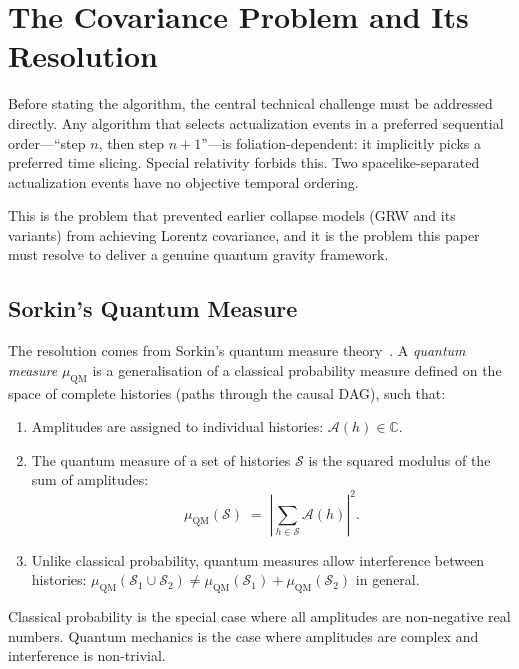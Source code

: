 \documentclass[11pt,a4paper]{article}
\theoremstyle{plain}
\theoremstyle{definition}
\theoremstyle{remark}
\newcommand{\muC}{\mu_{\mathrm{QM}}}   %
\begin{document}
\section{The Covariance Problem and Its Resolution}
\label{sec:covariance}

Before stating the algorithm, the central technical challenge must be addressed
directly. Any algorithm that selects actualization events in a preferred sequential
order---``step $n$, then step $n+1$''---is foliation-dependent: it implicitly
picks a preferred time slicing. Special relativity forbids this. Two
spacelike-separated actualization events have no objective temporal ordering.

This is the problem that prevented earlier collapse models (GRW and its
variants) from achieving Lorentz covariance, and it is the problem this paper
must resolve to deliver a genuine quantum gravity framework.

\subsection{Sorkin's Quantum Measure}

The resolution comes from Sorkin's quantum measure theory~\citep{Sorkin1994,
Sorkin2007}. A \emph{quantum measure} $\muC$ is a generalisation of a classical
probability measure defined on the space of complete histories (paths through
the causal DAG), such that:
\begin{enumerate}[noitemsep]
  \item Amplitudes are assigned to individual histories: $\mathcal{A}(h) \in \mathbb{C}$.
  \item The quantum measure of a set of histories $\mathcal{S}$ is the squared
  modulus of the sum of amplitudes:
  \begin{equation}
    \muC(\mathcal{S}) \;=\; \left|\sum_{h \in \mathcal{S}} \mathcal{A}(h)\right|^2.
    \label{eq:quantum_measure}
  \end{equation}
  \item Unlike classical probability, quantum measures allow interference
  between histories: $\muC(\mathcal{S}_1 \cup \mathcal{S}_2) \neq
  \muC(\mathcal{S}_1) + \muC(\mathcal{S}_2)$ in general.
\end{enumerate}
Classical probability is the special case where all amplitudes are
non-negative real numbers. Quantum mechanics is the case where amplitudes
are complex and interference is non-trivial.
\end{document}
